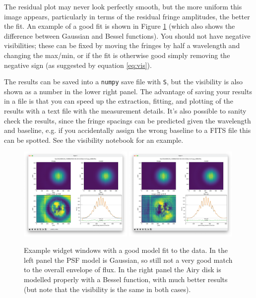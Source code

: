 \documentclass[11pt]{article}
\begin{document}
The residual plot may never look perfectly smooth, but the more uniform this image appears, particularly in terms of the residual fringe amplitudes, the better the fit. An example of a good fit is shown in Figure \ref{fig:widget2} (which also shows the difference between Gaussian and Bessel functions). You should not have negative visibilities; these can be fixed by moving the fringes by half a wavelength and changing the max/min, or if the fit is otherwise good simply removing the negative sign (as suggested by equation \ref{eq:vis}).

The results can be saved into a \texttt{numpy} save file with \texttt{S}, but the visibility is also shown as a number in the lower right panel. The advantage of saving your results in a file is that you can speed up the extraction, fitting, and plotting of the results with a text file with the measurement details. It's also possible to sanity check the results, since the fringe spacings can be predicted given the wavelength and baseline, e.g. if you accidentally assign the wrong baseline to a FITS file this can be spotted. See the visibility notebook for an example.

\begin{figure}[h]
    \centering
    \includegraphics[width=0.49\textwidth]{widget2.png}
    \includegraphics[width=0.49\textwidth]{widget3.png}
    \caption{Example widget windows with a good model fit to the data. In the left panel the PSF model is Gaussian, so still not a very good match to the overall envelope of flux. In the right panel the Airy disk is modelled properly with a Bessel function, with much better results (but note that the visibility is the same in both cases).}
    \label{fig:widget2}
\end{figure}
\end{document}
